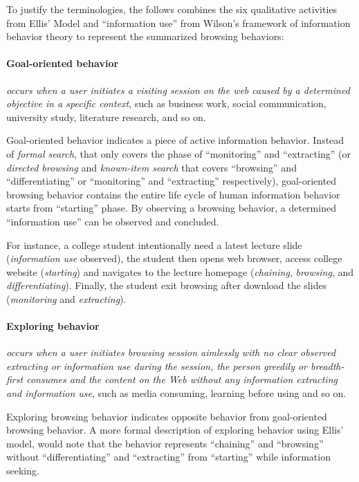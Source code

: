 To justify the terminologies, the follows combines the six qualitative activities from Ellis' Model 
\cite{ellis1989behavioural} and ``information use'' from Wilson's framework 
\cite{wilson1997information} of information behavior theory 
to represent the summarized browsing behaviors:

\paragraph{Goal-oriented behavior} \emph{occurs when a user initiates 
a visiting session on the web caused by a determined objective in a specific context}, 
such as business work, 
social communication, university study, literature research, and so on. 

Goal-oriented behavior indicates a piece of active information behavior.
Instead of \emph{formal search}, that only covers the phase of ``monitoring'' and ``extracting''
(or \emph{directed browsing} and \emph{known-item search} that covers ``browsing'' and ``differentiating'' or 
``monitoring'' and ``extracting'' respectively), 
goal-oriented browsing behavior contains the entire life cycle of human information behavior starts
from ``starting'' phase. By observing a browsing behavior, a determined ``information use'' 
can be observed and concluded.

For instance, a college student intentionally need a latest lecture slide (\emph{information use} observed), 
the student then opens web browser, access college website (\emph{starting}) and navigates to the lecture homepage 
(\emph{chaining}, \emph{browsing}, and \emph{differentiating}).
Finally, the student exit browsing after download the slides (\emph{monitoring} and \emph{extracting}).

\paragraph{Exploring behavior} \emph{occurs when a user initiates browsing session 
aimlessly with no clear observed extracting or information use during the session, 
the person greedily or breadth-first consumes and the content on the Web without 
any information extracting and information use}, such as media consuming, learning 
before using and so on.

Exploring browsing behavior indicates opposite behavior from 
goal-oriented browsing behavior. A more formal description of exploring behavior using Ellis' model, 
would note that the behavior represents ``chaining'' and ``browsing''
without ``differentiating'' and ``extracting'' from ``starting'' while information seeking.

